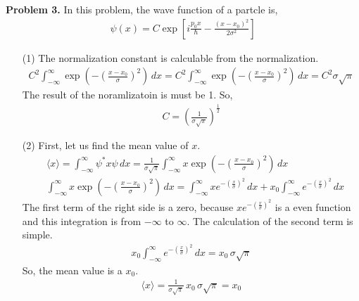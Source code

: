 \documentclass[aps,floatfix,nofootinbib,superscriptaddress,fleqn]{revtex4}
\begin{document}
\noindent \textbf{Problem 3.} In this problem, the wave function of a partcle is,
\begin{align}
  \psi(x) = C\exp\left[
  i\frac{p_0 x}{\hbar} - \frac{{(x-x_0)}^2}{2\sigma^2} 
  \right]
  \end{align}
  \begin{itemize}

  \item[(1)] The normalization constant is calculable from the normalization.
    \begin{align}
      C^2\int_{-\infty}^{\infty} \exp\left(-{\left(\frac{x-x_0}{\sigma} \right)}^2\right)\,dx 
      = C^2\int_{-\infty}^{\infty}\exp\left(-{\left(\frac{x-x_0}{\sigma} \right)}^2\right)\,dx 
      = C^2\sigma \sqrt{\pi}
    \end{align}
  The result of the noramlizatoin is must be 1. So,
    \begin{align}
      C = {\left(\frac{1}{\sigma \sqrt{\pi}}\right)}^{\frac{1}{2}}
    \end{align}
  \item[(2)]First, let us find the mean value of $x$.
    \begin{align}
      &\langle x \rangle=\int_{-\infty}^{\infty}\psi^*x\psi\,dx 
        = \frac{1}{\sigma\sqrt{\pi}}\int_{-\infty}^{\infty} x \exp\left(-{\left( \frac{x-x_0}{\sigma} \right)}^2\right)\,dx \\
      &\int_{-\infty}^{\infty} x \exp\left(-{\left( \frac{x-x_0}{\sigma} \right)}^2\right)\,dx 
        = \int_{-\infty}^{\infty} x e^{-{\left(\frac{x}{\sigma}\right)}^2}\,dx 
          + x_0\int_{-\infty}^{\infty} e^{-{\left(\frac{x}{\sigma}\right)}^2}\,dx
    \end{align}
  The first term of the right side is a zero, because $x e^{-{\left(\frac{x}{\sigma}\right)}^2}$ is a even function 
  and this integration is from $-\infty$ to $\infty$. The calculation of the second term is simple.
    \begin{align}
      x_0\int_{-\infty}^{\infty} e^{-{\left(\frac{x}{\sigma}\right)}^2}\,dx = x_0\,\sigma\sqrt{\pi}
    \end{align}
  So, the mean value is a $x_0$.
    \begin{align}
      \langle x \rangle=\frac{1}{\sigma\sqrt{\pi}}\,x_0\,\sigma\sqrt{\pi} = x_0

\end{align}
\end{itemize}
\end{document}
